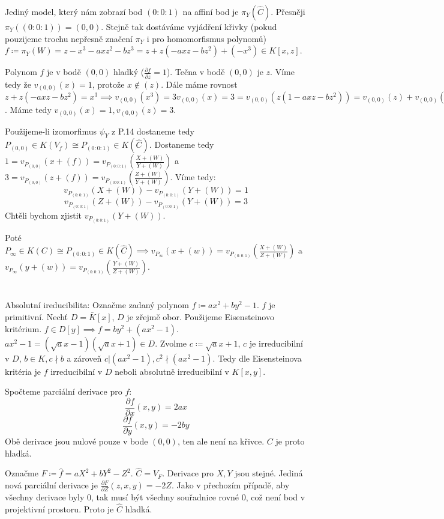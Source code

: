 \documentclass[12pt, a4paper]{article}
\begin{document}
Jediný model, který nám zobrazí bod $(0:0:1)$ na affiní bod je $\pi_Y(\hat{C})$. Přesněji $\pi_Y((0:0:1))=(0,0)$. Stejně tak dostáváme vyjádření křivky (pokud pouzijeme trochu nepřesně značení $\pi_Y$ i pro homomorfismus polynomů) $f \coloneqq \pi_Y(W) = z - x^3 - axz^2 - bz^3 = z + z(-axz - bz^2) + (-x^3) \in K[x,z]$.

Polynom $f$ je v bodě $(0,0)$ hladký ($\frac{\partial f}{\partial z} = 1$). Tečna v bodě $(0,0)$ je $z$. Víme tedy že $v_{(0,0)}(x) = 1$, protože $x \notin (z)$. Dále máme rovnost $z + z(-axz - bz^2) = x^3 \implies v_{(0,0)}(x^3) = 3v_{(0,0)}(x) = 3 = v_{(0,0)}(z(1 -axz - bz^2)) = v_{(0,0)}(z) + v_{(0,0)}(1 -axz - bz^2) = v_{(0,0)}(z)$. Máme tedy $v_{(0,0)}(x)=1, v_{(0,0)}(z) = 3$.

Použijeme-li izomorfimus $\psi_Y$ z P.14 dostaneme tedy $P_{(0,0)} \in K(V_f) \cong P_{(0:0:1)} \in K(\hat{C})$. Dostaneme tedy $1 = v_{P_{(0,0)}}(x+(f)) = v_{P_{(0:0:1)}}(\frac{X+(W)}{Y+(W)})$ a $3 = v_{P_{(0,0)}}(z+(f)) = v_{P_{(0:0:1)}}(\frac{Z+(W)}{Y+(W)})$. Víme tedy:
\[
v_{P_{(0:0:1)}}(X+(W)) - v_{P_{(0:0:1)}}({Y+(W)}) = 1
\]
\[
v_{P_{(0:0:1)}}(Z+(W)) - v_{P_{(0:0:1)}}({Y+(W)}) = 3
\]
Chtěli bychom zjistit $v_{P_{(0:0:1)}}(Y+(W))$.

Poté $P_{\infty} \in K(C) \cong P_{(0:0:1)} \in K(\hat{C}) \implies v_{P_\infty}(x+(w)) = v_{P_{(0:0:1)}}(\frac{X+(W)}{Z+(W)})$ a \\$v_{P_\infty}(y+(w)) = v_{P_{(0:0:1)}}(\frac{Y+(W)}{Z+(W)})$.
\section{}
Absolutní ireducibilita: Označme zadaný polynom $f \coloneqq ax^2+by^2-1$. $f$ je primitivní. Nechť $D = \bar{K}[x]$, $D$ je zřejmě obor. Použijeme Eisensteinovo kritérium. $f \in D[y] \implies f = by^2 + (ax^2-1)$. $ax^2-1 = (\sqrt{a}x-1)(\sqrt{a}x+1) \in D$. Zvolme $c \coloneqq \sqrt{a}x+1$, $c$ je irreducibilní v $D$,  $b \in K, c \nmid b$ a zároveň $c | (ax^2-1), c^2 \nmid (ax^2-1)$. Tedy dle Eisensteinova kritéria je $f$ irreducibilní v $D$ neboli absolutně irreducibilní v $K[x,y]$.

Spočteme parciální derivace pro $f$:
\[
\frac{\partial f}{\partial x}(x,y) = 2ax
\]
\[
\frac{\partial f}{\partial y}(x,y) = -2by
\]
Obě derivace jsou nulové pouze v bode $(0,0)$, ten ale není na křivce. $C$ je proto hladká.

Označme $F \coloneqq \hat{f} = aX^2+bY^2-Z^2$. $\hat{C} = V_F$.  Derivace pro $X,Y$ jsou stejné. Jediná nová parciální derivace je $\frac{\partial F}{\partial Z}(z,x,y) = -2Z$. Jako v přechozím případě, aby všechny derivace byly 0, tak musí být všechny souřadnice rovné 0, což není bod v projektivní prostoru. Proto je $\hat{C}$ hladká.
\end{document}
